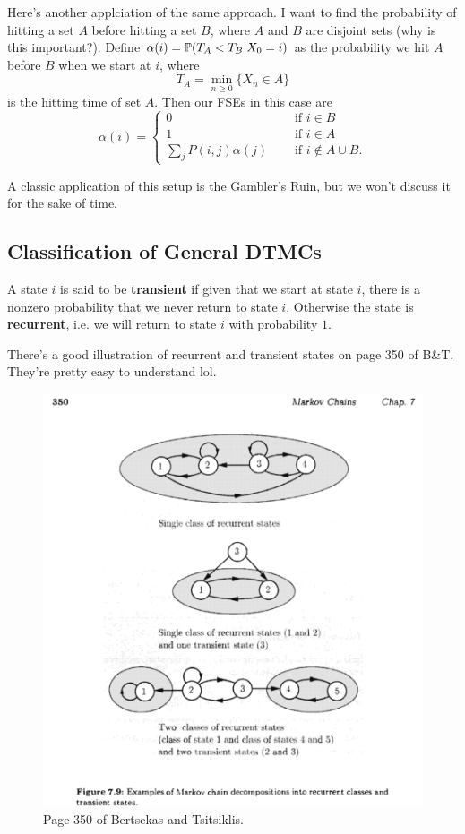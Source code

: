 \documentclass[11 pt]{scrartcl}
\begin{document}
Here's another applciation of the same approach. I want to find the probability of hitting a set $A$ before hitting a set $B$, where $A$ and $B$ are disjoint sets (why is this important?). Define $\alpha(i) = \mathbb P(T_A < T_B | X_0 = i)$ as the probability we hit $A$ before $B$ when we start at $i$, where 
\[ T_A = \min_{n\geq 0} \{ X_n \in A \}\] 
is the hitting time of set $A$. Then our FSEs in this case are 
\[ \alpha(i) = \begin{cases} 
        0 \quad &\text{ if } i\in B \\
        1 \quad &\text{ if } i\in A \\
        \sum_{j} P(i,j)\alpha(j) \quad &\text{ if } i\not\in A\cup B.
    \end{cases} 
\]

A classic application of this setup is the Gambler's Ruin, but we won't discuss it for the sake of time. 

\subsection{Classification of General DTMCs}
\begin{definition}
    A state $i$ is said to be \textbf{transient} if given that we start at state $i$, there is a nonzero probability that we never return to state $i$. Otherwise the state is \textbf{recurrent}, i.e. we will return to state $i$ with probability $1$. 
\end{definition}

There's a good illustration of recurrent and transient states on page 350 of B\&T. They're pretty easy to understand lol. 


\begin{figure}[!ht]
    \centering
\includegraphics[scale = 0.7]{recurrent_transient.png}
\caption{Page 350 of Bertsekas and Tsitsiklis.}
\end{figure}
\end{document}
